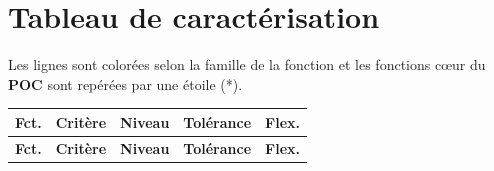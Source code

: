 \documentclass{report}
\begin{document}
\section{Tableau de caractérisation}

Les lignes sont colorées selon la famille de la fonction et les fonctions cœur du \textbf{POC} sont repérées par une étoile (*).

{\small
\setlength{\tabcolsep}{3.5pt}
\begin{longtable}{|p{1.0cm}|p{4.6cm}|p{4.3cm}|p{3.4cm}|p{0.8cm}|}
\hline
\rowcolor{gray!15}
\textbf{Fct.} & \textbf{Critère} & \textbf{Niveau} & \textbf{Tolérance} & \textbf{Flex.} \\ \hline
\endfirsthead
\hline
\rowcolor{gray!15}
\textbf{Fct.} & \textbf{Critère} & \textbf{Niveau} & \textbf{Tolérance} & \textbf{Flex.} \\ \hline
\endhead


\end{longtable}}
\end{document}
